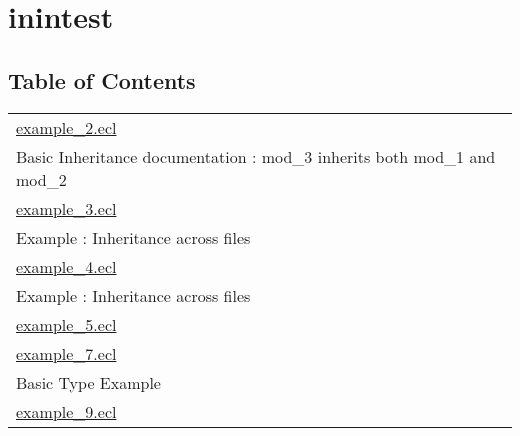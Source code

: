 \chapter*{inintest}
\hypertarget{ecldoc:toc:intest/inintest}{}


\section*{Table of Contents}
{\renewcommand{\arraystretch}{1.5}
\begin{longtable}{|p{\textwidth}|}
\hline
\hyperlink{ecldoc:toc:intest.inintest.example_2}{example\_2.ecl} \\
Basic Inheritance documentation : mod\_3 inherits both mod\_1 and mod\_2 \\
\hline
\hyperlink{ecldoc:toc:intest.inintest.example_3}{example\_3.ecl} \\
Example : Inheritance across files \\
\hline
\hyperlink{ecldoc:toc:intest.inintest.example_4}{example\_4.ecl} \\
Example : Inheritance across files \\
\hline
\hyperlink{ecldoc:toc:intest.inintest.example_5}{example\_5.ecl} \\
\hline
\hyperlink{ecldoc:toc:intest.inintest.example_7}{example\_7.ecl} \\
Basic Type Example \\
\hline
\hyperlink{ecldoc:toc:intest.inintest.example_9}{example\_9.ecl} \\
\hline
\end{longtable}
}







